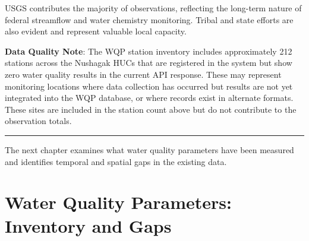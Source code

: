 \documentclass[
  letterpaper,
]{scrbook}
\newenvironment{Shaded}{\begin{snugshade}}{\end{snugshade}}
\newcommand{\AttributeTok}[1]{\textcolor[rgb]{0.40,0.45,0.13}{#1}}
\newcommand{\CommentTok}[1]{\textcolor[rgb]{0.37,0.37,0.37}{#1}}
\newcommand{\ControlFlowTok}[1]{\textcolor[rgb]{0.00,0.23,0.31}{\textbf{#1}}}
\newcommand{\FunctionTok}[1]{\textcolor[rgb]{0.28,0.35,0.67}{#1}}
\newcommand{\NormalTok}[1]{\textcolor[rgb]{0.00,0.23,0.31}{#1}}
\newcommand{\OtherTok}[1]{\textcolor[rgb]{0.00,0.23,0.31}{#1}}
\newcommand{\SpecialCharTok}[1]{\textcolor[rgb]{0.37,0.37,0.37}{#1}}
\newcommand{\StringTok}[1]{\textcolor[rgb]{0.13,0.47,0.30}{#1}}
\begin{document}
USGS contributes the majority of observations, reflecting the long-term
nature of federal streamflow and water chemistry monitoring. Tribal and
state efforts are also evident and represent valuable local capacity.

\textbf{Data Quality Note}: The WQP station inventory includes
approximately 212 stations across the Nushagak HUCs that are registered
in the system but show zero water quality results in the current API
response. These may represent monitoring locations where data collection
has occurred but results are not yet integrated into the WQP database,
or where records exist in alternate formats. These sites are included in
the station count above but do not contribute to the observation totals.

\begin{center}\rule{0.5\linewidth}{0.5pt}\end{center}

The next chapter examines what water quality parameters have been
measured and identifies temporal and spatial gaps in the existing data.

\chapter{Water Quality Parameters: Inventory and
Gaps}\label{water-quality-parameters-inventory-and-gaps}

\begin{Shaded}
\end{Shaded}
\end{document}
